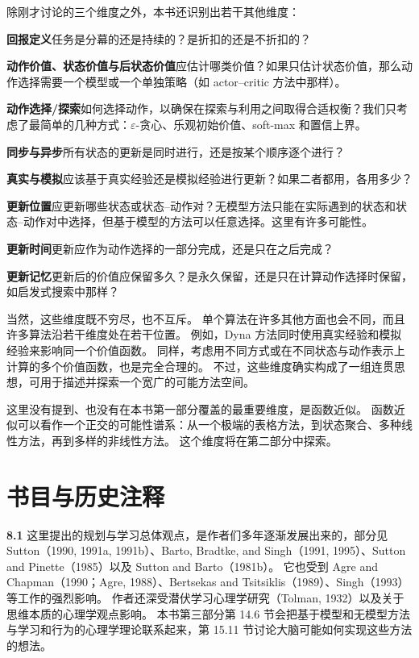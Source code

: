 \documentclass[UTF8,12pt,a4paper,fontset=fandol]{ctexart}
\begin{document}
除刚才讨论的三个维度之外，本书还识别出若干其他维度：

\noindent\textbf{回报定义}\quad 任务是分幕的还是持续的？是折扣的还是不折扣的？

\noindent\textbf{动作价值、状态价值与后状态价值}\quad 应估计哪类价值？如果只估计状态价值，那么动作选择需要一个模型或一个单独策略（如 actor--critic 方法中那样）。

\noindent\textbf{动作选择/探索}\quad 如何选择动作，以确保在探索与利用之间取得合适权衡？我们只考虑了最简单的几种方式：$\varepsilon$-贪心、乐观初始价值、soft-max 和置信上界。

\noindent\textbf{同步与异步}\quad 所有状态的更新是同时进行，还是按某个顺序逐个进行？

\noindent\textbf{真实与模拟}\quad 应该基于真实经验还是模拟经验进行更新？如果二者都用，各用多少？

\noindent\textbf{更新位置}\quad 应更新哪些状态或状态--动作对？无模型方法只能在实际遇到的状态和状态--动作对中选择，但基于模型的方法可以任意选择。这里有许多可能性。

\noindent\textbf{更新时间}\quad 更新应作为动作选择的一部分完成，还是只在之后完成？

\noindent\textbf{更新记忆}\quad 更新后的价值应保留多久？是永久保留，还是只在计算动作选择时保留，如启发式搜索中那样？

当然，这些维度既不穷尽，也不互斥。
单个算法在许多其他方面也会不同，而且许多算法沿若干维度处在若干位置。
例如，Dyna 方法同时使用真实经验和模拟经验来影响同一个价值函数。
同样，考虑用不同方式或在不同状态与动作表示上计算的多个价值函数，也是完全合理的。
不过，这些维度确实构成了一组连贯思想，可用于描述并探索一个宽广的可能方法空间。

这里没有提到、也没有在本书第一部分覆盖的最重要维度，是函数近似。
函数近似可以看作一个正交的可能性谱系：从一个极端的表格方法，到状态聚合、多种线性方法，再到多样的非线性方法。
这个维度将在第二部分中探索。

\section*{书目与历史注释}

\noindent\textbf{8.1}
这里提出的规划与学习总体观点，是作者们多年逐渐发展出来的，部分见 Sutton（1990, 1991a, 1991b）、Barto, Bradtke, and Singh（1991, 1995）、Sutton and Pinette（1985）以及 Sutton and Barto（1981b）。
它也受到 Agre and Chapman（1990；Agre, 1988）、Bertsekas and Tsitsiklis（1989）、Singh（1993）等工作的强烈影响。
作者还深受潜伏学习心理学研究（Tolman, 1932）以及关于思维本质的心理学观点影响。
本书第三部分第 14.6 节会把基于模型和无模型方法与学习和行为的心理学理论联系起来，第 15.11 节讨论大脑可能如何实现这些方法的想法。
\end{document}
